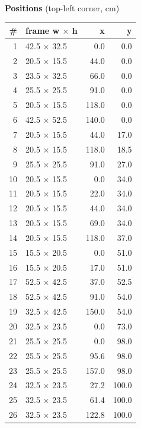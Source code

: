 \documentclass[a4paper,landscape,10pt]{article}
\begin{document}
\begin{minipage}[t]{0.25\textwidth}
\vspace{8pt}
{\bfseries Positions} (top-left corner, cm)\\[2pt]
\tiny
\begin{tabular}{@{}r l r r@{}}
\toprule
\# & frame w $\times$ h & x & y \\
\midrule
1 & 42.5 $\times$ 32.5 & 0.0 & 0.0 \\
2 & 20.5 $\times$ 15.5 & 44.0 & 0.0 \\
3 & 23.5 $\times$ 32.5 & 66.0 & 0.0 \\
4 & 25.5 $\times$ 25.5 & 91.0 & 0.0 \\
5 & 20.5 $\times$ 15.5 & 118.0 & 0.0 \\
6 & 42.5 $\times$ 52.5 & 140.0 & 0.0 \\
7 & 20.5 $\times$ 15.5 & 44.0 & 17.0 \\
8 & 20.5 $\times$ 15.5 & 118.0 & 18.5 \\
9 & 25.5 $\times$ 25.5 & 91.0 & 27.0 \\
10 & 20.5 $\times$ 15.5 & 0.0 & 34.0 \\
11 & 20.5 $\times$ 15.5 & 22.0 & 34.0 \\
12 & 20.5 $\times$ 15.5 & 44.0 & 34.0 \\
13 & 20.5 $\times$ 15.5 & 69.0 & 34.0 \\
14 & 20.5 $\times$ 15.5 & 118.0 & 37.0 \\
15 & 15.5 $\times$ 20.5 & 0.0 & 51.0 \\
16 & 15.5 $\times$ 20.5 & 17.0 & 51.0 \\
17 & 52.5 $\times$ 42.5 & 37.0 & 52.5 \\
18 & 52.5 $\times$ 42.5 & 91.0 & 54.0 \\
19 & 32.5 $\times$ 42.5 & 150.0 & 54.0 \\
20 & 32.5 $\times$ 23.5 & 0.0 & 73.0 \\
21 & 25.5 $\times$ 25.5 & 0.0 & 98.0 \\
22 & 25.5 $\times$ 25.5 & 95.6 & 98.0 \\
23 & 25.5 $\times$ 25.5 & 157.0 & 98.0 \\
24 & 32.5 $\times$ 23.5 & 27.2 & 100.0 \\
25 & 32.5 $\times$ 23.5 & 61.4 & 100.0 \\
26 & 32.5 $\times$ 23.5 & 122.8 & 100.0 \\
\bottomrule
\end{tabular}
\end{minipage}
\clearpage
\end{document}
